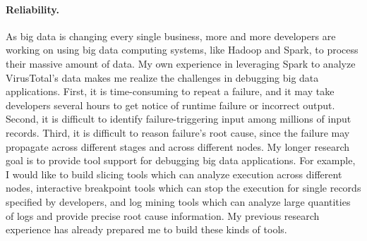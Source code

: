 \documentclass[10pt]{article}
\begin{document}
\vspace{-.1in}
\paragraph{Reliability.} 
As big data is changing every single business, 
more and more developers are working on using big data computing systems, 
like Hadoop and Spark, to process their massive amount of data. 
My own experience in leveraging Spark to analyze VirusTotal's data 
makes me realize the challenges in debugging big data applications. 
First, it is time-consuming to repeat a failure, and it may take developers several hours to get notice of runtime failure or incorrect output.
Second, it is difficult to identify failure-triggering input among millions of input records.
Third, it is difficult to reason failure's root cause, since the failure may propagate across different stages and across different nodes. 
My longer research goal is to provide tool support for debugging big data applications.
For example, I would like to build slicing tools which can analyze execution across different nodes, 
interactive breakpoint tools which can stop the execution for single records specified by developers, 
and log mining tools which can analyze large quantities of logs and provide precise root cause information. 
My previous research experience has already prepared me to build these kinds of tools. 




\newpage


\end{document}
